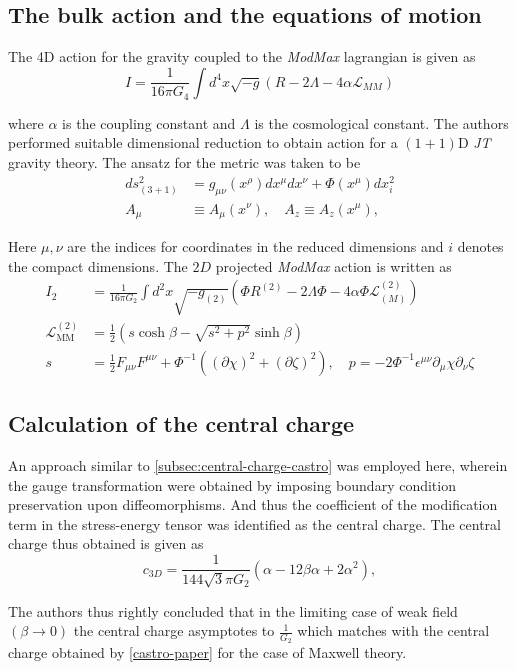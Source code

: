 \subsection{The bulk action and the equations of motion}
The 4D action for the gravity coupled to the \textit{ModMax} lagrangian is given as 
\begin{equation}
    I = \frac{1}{16\pi G_4}\int d^4x\sqrt{-g}\left(R - 2\Lambda - 4\alpha\mathcal{L}_{MM}\right)
\end{equation}

where $\alpha$ is the coupling constant and $\Lambda$ is the cosmological constant. The authors performed suitable dimensional reduction to obtain action for a $\left( 1+1 \right)$D \textit{JT} gravity theory. The ansatz for the metric was taken to be 
\begin{align}
    ds_{(3+1)}^2 &= g_{\mu\nu}(x^\rho)dx^\mu dx^\nu + \Phi(x^\mu)dx_i^2 \\
    A_\mu &\equiv A_\mu(x^\nu), \quad A_z \equiv A_z(x^\mu),
\end{align}

Here $\mu, \nu$ are the indices for coordinates in the reduced dimensions and $i$ denotes the compact dimensions. The $2D$ projected \textit{ModMax} action is written as 
\begin{align}
    I_2 &= \frac{1}{16\pi G_2}\int d^2x\sqrt{-g_{(2)}}\left(\Phi R^{(2)} - 2\Lambda\Phi - 4\alpha\Phi\mathcal{L}_{(M)}^{(2)}\right) \\ 
    \mathcal{L}_{\text{MM}}^{(2)} &= \frac{1}{2}\left(s\cosh\beta - \sqrt{s^2 + p^2}\sinh\beta\right) \\
    s &= \frac{1}{2}F_{\mu\nu}F^{\mu\nu} + \Phi^{-1}\left((\partial\chi)^2 + (\partial\zeta)^2\right), \quad p = -2\Phi^{-1}\epsilon^{\mu\nu}\partial_\mu\chi\partial_\nu\zeta
\end{align}

\subsection{Calculation of the central charge}
An approach similar to \ref{subsec:central-charge-castro} was employed here, wherein the gauge transformation were obtained by imposing boundary condition preservation upon diffeomorphisms. And thus the coefficient of the modification term in the stress-energy tensor was identified as the central charge. The central charge thus obtained is given as
\begin{equation}
c_{3D} = \frac{1}{144\sqrt{3}\pi G_2}\left(\alpha - 12\beta\alpha + 2\alpha^2\right),
\end{equation}

The authors thus rightly concluded that in the limiting case of weak field $\left( \beta\to 0 \right) $ the central charge asymptotes to $\displaystyle\frac{1}{G_2}$ which matches with the central charge obtained by \ref{castro-paper} for the case of Maxwell theory.


